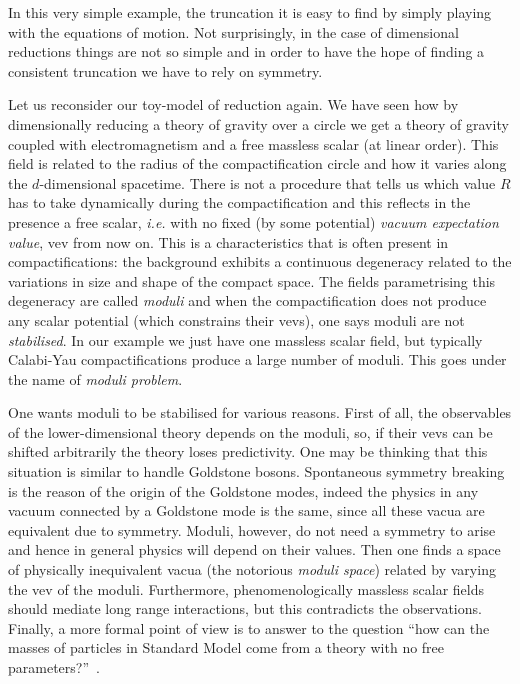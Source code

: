 \documentclass[draft]{phd}
\begin{document}
			In this very simple example, the truncation it is easy to find by simply playing with the equations of motion.
			Not surprisingly, in the case of dimensional reductions things are not so simple and in order to have the hope of finding a consistent truncation we have to rely on symmetry.
			
			Let us reconsider our toy-model of reduction again.
			We have seen how by dimensionally reducing a theory of gravity over a circle we get a theory of gravity coupled with electromagnetism and a free massless scalar (at linear order). 
			This field is related to the radius of the compactification circle and how it varies along the $d$-dimensional spacetime.
			There is not a procedure that tells us which value $R$ has to take dynamically during the compactification and this reflects in the presence a free scalar, \emph{i.e.} with no fixed (by some potential) \emph{vacuum expectation value}, vev from now on.
			This is a characteristics that is often present in compactifications: the background exhibits a continuous degeneracy related to the variations in size and shape of the compact space.
			The fields parametrising this degeneracy are called \emph{moduli} and when the compactification does not produce any scalar potential (which constrains their vevs), one says moduli are not \emph{stabilised}.
			In our example we just have one massless scalar field, but typically Calabi-Yau compactifications produce a large number of moduli.
			This goes under the name of \emph{moduli problem}.
			
			One wants moduli to be stabilised for various reasons.
			First of all, the observables of the lower-dimensional theory depends on the moduli, so, if their vevs can be shifted arbitrarily the theory loses predictivity.
			One may be thinking that this situation is similar to handle Goldstone bosons.
			Spontaneous symmetry breaking is the reason of the origin of the Goldstone modes, indeed the physics in any vacuum connected by a Goldstone mode is the same, since all these vacua are equivalent due to symmetry.
			Moduli, however, do not need a symmetry to arise and hence in general physics will depend on their values.
			Then one finds a space of physically inequivalent vacua (the notorious \emph{moduli space}) related by varying the vev of the moduli.
			Furthermore, phenomenologically massless scalar fields should mediate long range interactions, but this contradicts the observations.
			Finally, a more formal point of view is to answer to the question ``how can the masses of particles in Standard Model come from a theory with no free parameters?''~\cite{moduliLect, fluxcomp1}.
				
\end{document}
